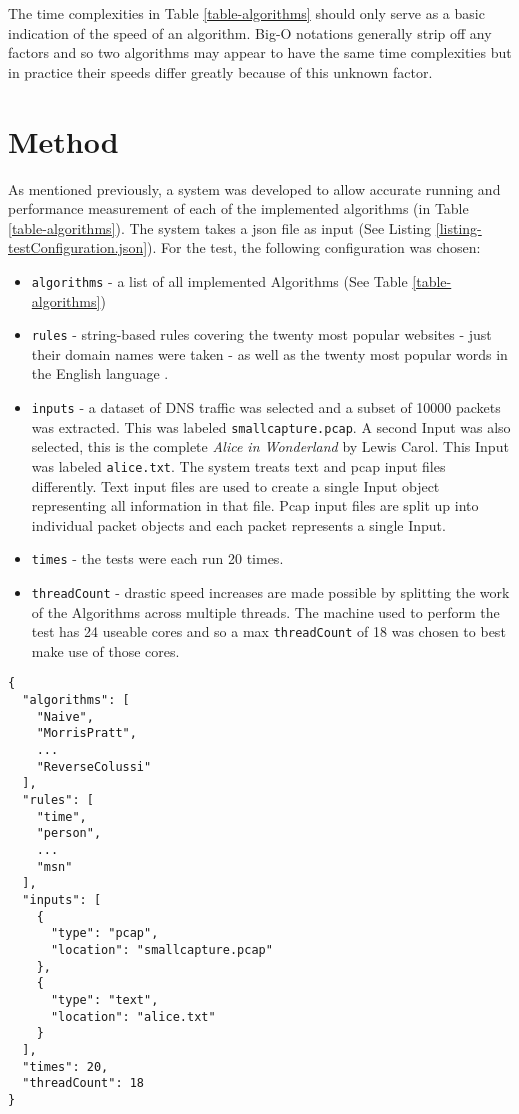 \documentclass[11pt]{article}
\begin{document}
The time complexities in Table \ref{table-algorithms} should only serve as a basic indication of the speed of an algorithm. Big-O notations generally strip off any factors and so two algorithms may appear to have the same time complexities but in practice their speeds differ greatly because of this unknown factor.

\section{Method}

As mentioned previously, a system was developed to allow accurate running and performance measurement of each of the implemented algorithms (in Table \ref{table-algorithms}). The system takes a json file as input (See Listing \ref{listing-testConfiguration.json}). For the test, the following configuration was chosen:
\begin{itemize}
  \item \texttt{algorithms} - a list of all implemented Algorithms (See Table \ref{table-algorithms}) 
  \item \texttt{rules} - string-based rules covering the twenty most popular websites \citep{alexa2016} - just their domain names were taken - as well as the twenty most popular words in the English language \citep{oed2016}.
  \item \texttt{inputs} - a dataset of DNS traffic was selected and a subset of 10000 packets was extracted. This was labeled \texttt{smallcapture.pcap}. A second Input was also selected, this is the complete \textit{Alice in Wonderland} by Lewis Carol. This Input was labeled \texttt{alice.txt}. The system treats text and pcap input files differently. Text input files are used to create a single Input object representing all information in that file. Pcap input files are split up into individual packet objects and each packet represents a single Input.
  \item \texttt{times} - the tests were each run 20 times.
  \item \texttt{threadCount} - drastic speed increases are made possible by splitting the work of the Algorithms across multiple threads. The machine used to perform the test has 24 useable cores and so a max \texttt{threadCount} of 18 was chosen to best make use of those cores.
\end{itemize}


\begin{lstlisting}[caption = {Sample testConfiguration.json}, label = {listing-testConfiguration.json}]
{
  "algorithms": [
    "Naive",
    "MorrisPratt",
    ...
    "ReverseColussi"
  ],
  "rules": [
    "time",
    "person",
    ...
    "msn"
  ],
  "inputs": [
    {
      "type": "pcap",
      "location": "smallcapture.pcap"
    },
    {
      "type": "text",
      "location": "alice.txt"
    }
  ],
  "times": 20,
  "threadCount": 18
}
\end{lstlisting}
\end{document}

